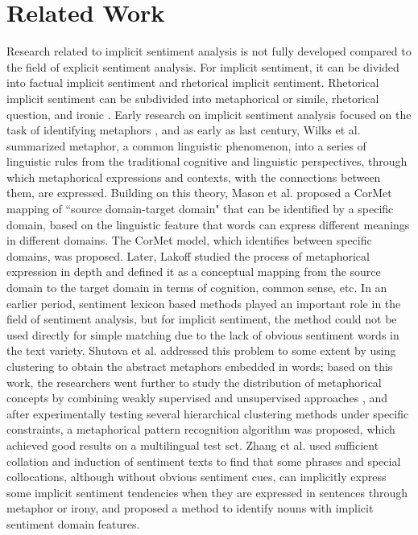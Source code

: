 \section{Related Work}


Research related to implicit sentiment analysis is not fully developed compared to the field of explicit sentiment analysis\cite{erik2017sentiment,liu2020sentiment}.
For implicit sentiment, it can be divided into factual implicit sentiment and rhetorical implicit sentiment.
Rhetorical implicit sentiment can be subdivided into metaphorical or simile, rhetorical question, and ironic \cite{liao2019identification}.
Early research on implicit sentiment analysis focused on the task of identifying metaphors \cite{LiaoJian2018}, and as early as last century, Wilks et al. summarized metaphor, a common linguistic phenomenon, into a series of linguistic rules from the traditional cognitive and linguistic perspectives, through which metaphorical expressions and contexts, with the connections between them, are expressed.
Building on this theory, Mason et al. \cite{mason2004cormet} proposed a CorMet mapping of ``source domain-target domain" that can be identified by a specific domain, based on the linguistic feature that words can express different meanings in different domains. The CorMet model, which identifies between specific domains, was proposed.
Later, Lakoff \cite {J2008LakoffGeorge} studied the process of metaphorical expression in depth and defined it as a conceptual mapping from the source domain to the target domain in terms of cognition, common sense, etc.
In an earlier period, sentiment lexicon based methods played an important role in the field of sentiment analysis, but for implicit sentiment, the method could not be used directly for simple matching due to the lack of obvious sentiment words in the text variety.
Shutova et al.\cite{shutova2013statistical} addressed this problem to some extent by using clustering to obtain the abstract metaphors embedded in words; based on this work, the researchers went further to study the distribution of metaphorical concepts by combining weakly supervised and unsupervised approaches \cite{shutova2017multilingual}, and after experimentally testing several hierarchical clustering methods under specific constraints, a metaphorical pattern recognition algorithm was proposed, which achieved good results on a multilingual test set.
Zhang et al.\cite{zhang2011identifying} used sufficient collation and induction of sentiment texts to find that some phrases and special collocations, although without obvious sentiment cues, can implicitly express some implicit sentiment tendencies when they are expressed in sentences through metaphor or irony, and proposed a method to identify nouns with implicit sentiment domain features.

